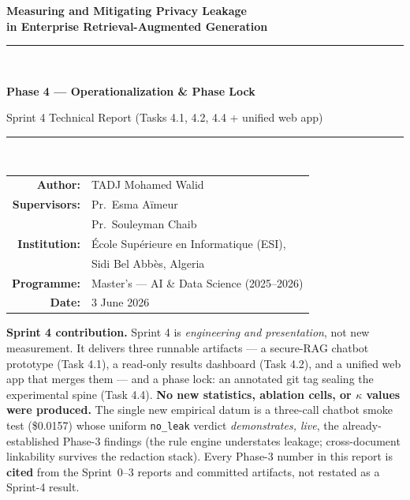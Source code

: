 \documentclass[11pt,a4paper]{article}
\title{}\author{}\date{}
\newcommand{\kpa}{\ensuremath{\kappa}}
\begin{document}
\begin{titlepage}
\centering
\vspace*{1.5cm}
{\Large\bfseries Measuring and Mitigating Privacy Leakage\\[2pt] in Enterprise Retrieval-Augmented Generation\par}
\vspace{1.0cm}
{\rule{0.8\textwidth}{0.4pt}}\\[6pt]
{\Huge\bfseries Phase 4 --- Operationalization \& Phase Lock\par}
\vspace{4pt}
{\large Sprint 4 Technical Report (Tasks 4.1, 4.2, 4.4 + unified web app)\par}
{\rule{0.8\textwidth}{0.4pt}}\\[1.2cm]

\begin{tabular}{rl}
\textbf{Author:} & TADJ Mohamed Walid\\[4pt]
\textbf{Supervisors:} & Pr.\ Esma A\"imeur\\
                      & Pr.\ Souleyman Chaib\\[4pt]
\textbf{Institution:} & \'Ecole Sup\'erieure en Informatique (ESI),\\
                      & Sidi Bel Abb\`es, Algeria\\[4pt]
\textbf{Programme:} & Master's --- AI \& Data Science (2025--2026)\\[4pt]
\textbf{Date:} & 3 June 2026\\
\end{tabular}

\vfill
\begin{tcolorbox}[colback=blue!3,colframe=blue!40!black,width=0.9\textwidth,boxrule=0.5pt]
\small\textbf{Sprint 4 contribution.} Sprint 4 is \emph{engineering and presentation}, not new
measurement. It delivers three runnable artifacts --- a secure-RAG chatbot prototype (Task 4.1), a
read-only results dashboard (Task 4.2), and a unified web app that merges them --- and a phase lock:
an annotated git tag sealing the experimental spine (Task 4.4). \textbf{No new statistics, ablation
cells, or \kpa{} values were produced.} The single new empirical datum is a three-call chatbot smoke
test (\$0.0157) whose uniform \texttt{no\_leak} verdict \emph{demonstrates, live}, the
already-established Phase-3 findings (the rule engine understates leakage; cross-document linkability
survives the redaction stack). Every Phase-3 number in this report is \textbf{cited} from the
Sprint~0--3 reports and committed artifacts, not restated as a Sprint-4 result.
\end{tcolorbox}
\vspace{1cm}
\end{titlepage}
\end{document}
